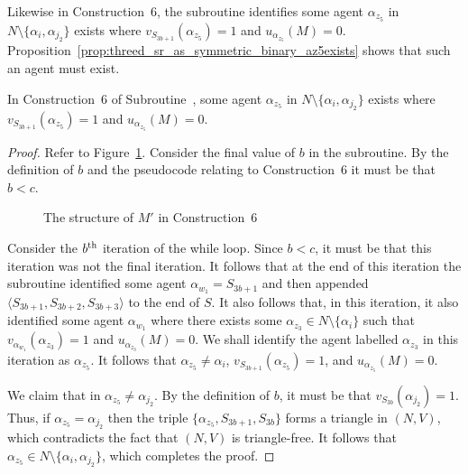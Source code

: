 Likewise in Construction~6, the subroutine identifies some agent $\alpha_{z_5}$ in $N\setminus \{ \alpha_i, \alpha_{j_2} \}$ exists where $v_{S_{3b+1}}(\alpha_{z_5})=1$ and $u_{\alpha_{z_5}}(M)=0$. Proposition~\ref{prop:threed_sr_as_symmetric_binary_az5exists} shows that such an agent must exist.

\begin{prop}
\label{prop:threed_sr_as_symmetric_binary_az5exists}
In Construction~6 of Subroutine~, some agent $\alpha_{z_5}$ in $N\setminus \{ \alpha_i, \alpha_{j_2} \}$ exists where $v_{S_{3b+1}}(\alpha_{z_5})=1$ and $u_{\alpha_{z_5}}(M)=0$.
\end{prop}
\begin{proof}
Refer to Figure~\ref{fig:threed_sr_as_symmetric_binary_repair_algorithm_7_cases_case_6}. Consider the final value of $b$ in the subroutine. By the definition of $b$ and the pseudocode relating to Construction~6 it must be that $b < c$.

\begin{figure}
    \centering
    
    \caption{The structure of $M'$ in Construction~6} 
    \label{fig:threed_sr_as_symmetric_binary_repair_algorithm_7_cases_case_6}
\end{figure}

Consider the $b\textsuperscript{th}$ iteration of the while loop. Since $b < c$, it must be that this iteration was not the final iteration. It follows that at the end of this iteration the subroutine identified some agent $\alpha_{w_1}=S_{3b+1}$ and then appended $\langle S_{3b+1}, S_{3b+2}, S_{3b+3} \rangle$ to the end of $S$. It also follows that, in this iteration, it also identified some agent $\alpha_{w_1}$ where there exists some $\alpha_{z_3} \in N \setminus \{ \alpha_i \}$ such that $v_{\alpha_{w_1}}(\alpha_{z_3})=1$ and $u_{\alpha_{z_3}}(M)=0$. We shall identify the agent labelled $\alpha_{z_3}$ in this iteration as $\alpha_{z_5}$. It follows that $\alpha_{z_5} \neq \alpha_i$, $v_{S_{3b + 1}}(\alpha_{z_5}) = 1$, and $u_{\alpha_{z_5}}(M)=0$.

We claim that in $\alpha_{z_5} \neq \alpha_{j_2}$. By the definition of $b$, it must be that $v_{S_{3b}}(\alpha_{j_2}) = 1$. Thus, if $\alpha_{z_5} = \alpha_{j_2}$ then the triple $\{ \alpha_{z_5}, S_{3b+1}, S_{3b} \}$ forms a triangle in $(N, V)$, which contradicts the fact that $(N, V)$ is triangle-free. It follows that $\alpha_{z_5} \in N\setminus \{ \alpha_i, \alpha_{j_2} \}$, which completes the proof.
\end{proof}

